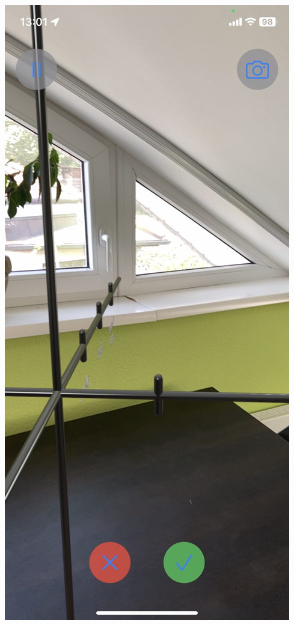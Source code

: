 \documentclass{report}
\begin{document}
\includegraphics[scale=0.2]{megerosites.jpeg}
\end{document}
